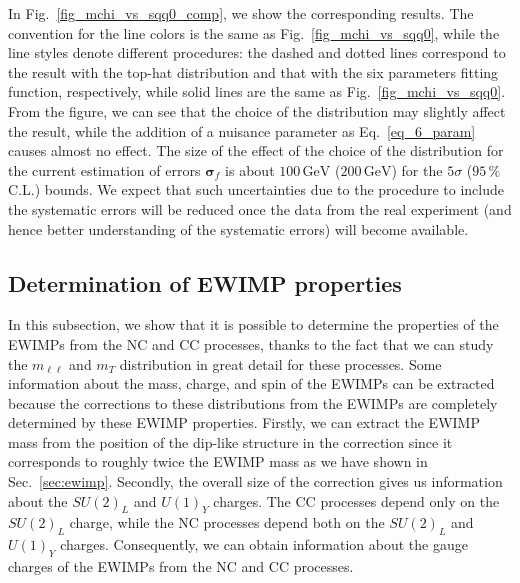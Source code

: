 \documentclass[12pt, a4paper]{article}
\begin{document}
In Fig.~\ref{fig_mchi_vs_sqq0_comp}, we show the corresponding
results.  The convention for the line colors is the same as
Fig.~\ref{fig_mchi_vs_sqq0}, while the line styles denote different
procedures: the dashed and dotted lines correspond to the result with
the top-hat distribution and that with the six parameters fitting
function, respectively, while solid lines are the same as
Fig.~\ref{fig_mchi_vs_sqq0}.  From the figure, we can see that the
choice of the distribution may slightly affect the result, while the
addition of a nuisance parameter as Eq.~\eqref{eq_6_param} causes
almost no effect.  The size of the effect of the choice of the
distribution for the current estimation of errors $\bm{\sigma}_f$ is
about $100\,\mathrm{GeV}$ ($200\,\mathrm{GeV}$) for the $5\sigma$
($95\,\%$ C.L.) bounds.  We expect that such uncertainties due to the
procedure to include the systematic errors will be reduced once the
data from the real experiment (and hence better understanding of the
systematic errors) will become available.

\subsection{Determination of EWIMP properties}
\label{sec_property}

In this subsection, we show that it is possible to determine the
properties of the EWIMPs from the NC and CC processes, thanks to the
fact that we can study the $m_{\ell\ell}$ and $m_T$ distribution in
great detail for these processes.  Some information about the mass,
charge, and spin of the EWIMPs can be extracted because the
corrections to these distributions from the EWIMPs are completely
determined by these EWIMP properties.  Firstly, we can extract the
EWIMP mass from the position of the dip-like structure in the
correction since it corresponds to roughly twice the EWIMP mass as we
have shown in Sec.~\ref{sec:ewimp}.  Secondly, the overall size of the
correction gives us information about the $SU(2)_L$ and $U(1)_Y$
charges.  The CC processes depend only on the $SU(2)_L$ charge, while
the NC processes depend both on the $SU(2)_L$ and $U(1)_Y$ charges.
Consequently, we can obtain information about the gauge charges of the
EWIMPs from the NC and CC processes.
\end{document}

